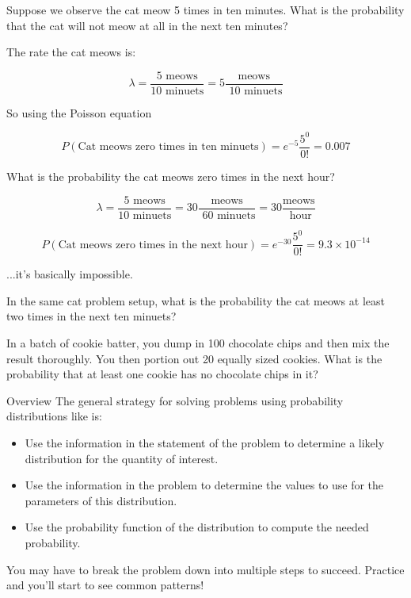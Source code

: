 %
\begin{frame}
Suppose we observe the cat meow 5 times in ten minutes.  What is the probability
that the cat will not meow at all in the next ten minutes?
\end{frame}
%

%
\begin{frame}
The rate the cat meows is:

$$ \lambda = \frac{5 \text{ meows}}{10 \text{ minuets}} = 5 \frac{ \text{
meows}}{\text{ 10 minuets}} $$

So using the Poisson equation

$$ P(\text{Cat meows zero times in ten minuets}) = e^{-5} \frac{5^0}{0!} = 0.007
$$
\end{frame}
%

%
\begin{frame}
What is the probability the cat meows zero times in the next hour?

$$ 
\lambda = \frac{5 \text{ meows}}{10 \text{ minuets}} = 30 \frac{ \text{
meows}}{\text{ 60 minuets}} = 30 \frac{ \text{
meows}}{\text{ hour}}
$$

$$ P(\text{Cat meows zero times in the next hour}) = e^{-30} \frac{5^0}{0!} =
9.3 \times 10^{-14}
$$

...it's basically impossible.
\end{frame}
%

%
\begin{frame}

In the same cat problem setup, what is the probability the cat meows at
least two times in the next ten minuets?

\hfill

In a batch of cookie batter, you dump in 100 chocolate chips and then mix the
result thoroughly.  You then portion out 20 equally sized cookies.  What is the
probability that at least one cookie has no chocolate chips in it?

\end{frame}
%

%
\begin{frame}{Overview}
The general strategy for solving problems using probability distributions like is:

\begin{itemize}
\item Use the information in the statement of the problem to determine a likely
distribution for the quantity of interest.
\item Use the information in the problem to determine the values to use for the
parameters of this distribution.
\item Use the probability function of the distribution to compute the needed
probability.
\end{itemize}

You may have to break the problem down into multiple steps to succeed.  Practice
and you'll start to see common patterns!

\end{frame}
%

